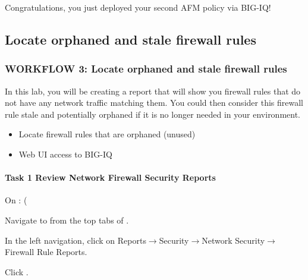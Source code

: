 \documentclass[letterpaper,10pt,english]{sphinxmanual}
\begin{document}
Congratulations, you just deployed your second AFM policy via BIG-IQ!


\subsection{Locate orphaned and stale firewall rules}
\label{\detokenize{class1/module5/lab3:locate-orphaned-and-stale-firewall-rules}}\label{\detokenize{class1/module5/lab3::doc}}

\subsubsection{WORKFLOW 3: Locate orphaned and stale firewall rules}
\label{\detokenize{class1/module5/lab3:workflow-3-locate-orphaned-and-stale-firewall-rules}}
In this lab, you will be creating a report that will show you firewall
rules that do not have any network traffic matching them. You could then
consider this firewall rule stale and potentially orphaned if it is no
longer needed in your environment.

\begin{itemize}
\item {} 
Locate firewall rules that are orphaned (unused)

\end{itemize}

\begin{itemize}
\item {} 
Web UI access to BIG-IQ

\end{itemize}


\paragraph{Task 1 \textendash{} Review Network Firewall Security Reports}
\label{\detokenize{class1/module5/lab3:task-1-review-network-firewall-security-reports}}
On : (

Navigate to  from the top tabs of .

In the left navigation, click on Reports\(\rightarrow\)Security\(\rightarrow\)Network
Security\(\rightarrow\)Firewall Rule Reports.


Click .
\end{document}
